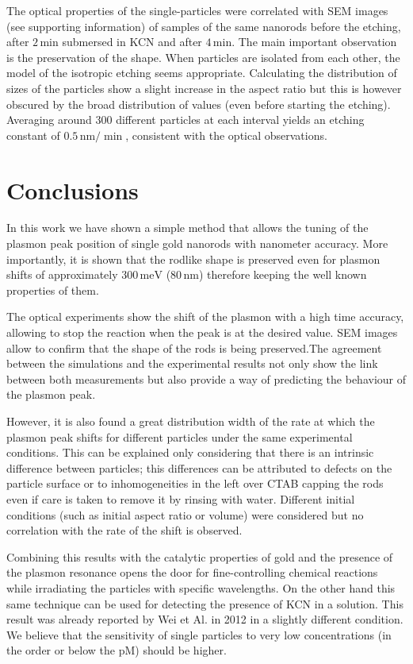 \documentclass[twocolumn]{article}
\begin{document}
The optical properties of the single-particles were correlated with SEM images
(see supporting information) of samples of the same nanorods before the etching,
after $2\,\textrm{min}$ submersed in KCN and after $4\,\textrm{min}$. The main
important observation is the preservation of the shape. When particles are
isolated from each other, the model of the isotropic etching seems appropriate.
Calculating the distribution of sizes of the particles show a slight increase in
the aspect ratio but this is however obscured by the broad distribution of
values (even before starting the etching). Averaging around $300$ different
particles at each interval yields an etching constant of
$0.5\,\textrm{nm}/\min$, consistent with the optical observations.

\section{Conclusions}
In this work we have shown a simple method that allows the tuning of the plasmon
peak position of single gold nanorods with nanometer accuracy. More
importantly, it is shown that the rodlike shape is preserved even for plasmon
shifts of approximately $300\,\textrm{meV}$ ($80\,\textrm{nm}$) therefore
keeping the well known properties of them.

The optical experiments show the shift of the plasmon with a high time accuracy,
allowing to stop the reaction when the peak is at the desired value. SEM images
allow to confirm that the shape of the rods is being preserved.The agreement
between the simulations and the experimental results not only show the link
between both measurements but also provide a way of predicting the behaviour of
the plasmon peak.

However, it is also found a great distribution width of the rate at which the
plasmon peak shifts for different particles under the same experimental
conditions. This can be explained only considering that there is an intrinsic
difference between particles; this differences can be attributed to defects on
the particle surface or to inhomogeneities in the left over CTAB capping the
rods even if care is taken to remove it by rinsing with water. Different initial
conditions (such as initial aspect ratio or volume) were considered but no
correlation with the rate of the shift is observed.

Combining this results with the catalytic properties of gold and the presence of
the plasmon resonance opens the door for fine-controlling chemical reactions
while irradiating the particles with specific wavelengths. On the other hand
this same technique can be used for detecting the presence of KCN in a
solution. This result was already reported by Wei et Al. in 2012 \cite{Wei2012}
in a slightly different condition. We believe that the sensitivity of single
particles to very low concentrations (in the order or below the pM) should be
higher.

{}

\end{document}
